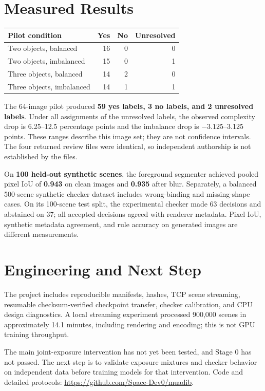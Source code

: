 \documentclass[10pt]{article}
\begin{document}
\section*{Measured Results}
\begin{table}[h]\centering\small
\begin{tabular}{lrrr}\toprule
Pilot condition & Yes & No & Unresolved\\\midrule
Two objects, balanced & 16 & 0 & 0\\
Two objects, imbalanced & 15 & 0 & 1\\
Three objects, balanced & 14 & 2 & 0\\
Three objects, imbalanced & 14 & 1 & 1\\\bottomrule
\end{tabular}
\end{table}
The 64-image pilot produced \textbf{59 yes labels, 3 no labels, and 2 unresolved labels}. Under all assignments of the unresolved labels, the observed complexity drop is 6.25--12.5 percentage points and the imbalance drop is $-3.125$--3.125 points. These ranges describe this image set; they are not confidence intervals. The four returned review files were identical, so independent authorship is not established by the files.

On \textbf{100 held-out synthetic scenes}, the foreground segmenter achieved pooled pixel IoU of \textbf{0.943} on clean images and \textbf{0.935} after blur. Separately, a balanced 500-scene synthetic checker dataset includes wrong-binding and missing-shape cases. On its 100-scene test split, the experimental checker made 63 decisions and abstained on 37; all accepted decisions agreed with renderer metadata. Pixel IoU, synthetic metadata agreement, and rule accuracy on generated images are different measurements.

\section*{Engineering and Next Step}
The project includes reproducible manifests, hashes, TCP scene streaming, resumable checksum-verified checkpoint transfer, checker calibration, and CPU design diagnostics. A local streaming experiment processed 900,000 scenes in approximately 14.1 minutes, including rendering and encoding; this is not GPU training throughput.

The main joint-exposure intervention has not yet been tested, and Stage 0 has not passed. The next step is to validate exposure mixtures and checker behavior on independent data before training models for that intervention. Code and detailed protocols: \url{https://github.com/Space-Dev0/muadib}.
\end{document}
